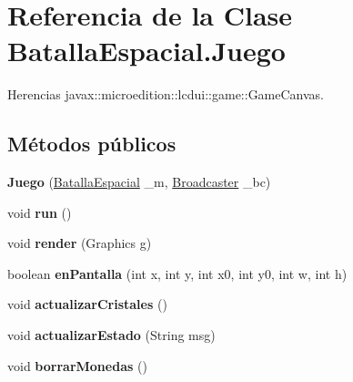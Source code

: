 \hypertarget{classBatallaEspacial_1_1Juego}{
\section{Referencia de la Clase BatallaEspacial.Juego}
\label{classBatallaEspacial_1_1Juego}
}


Herencias javax::microedition::lcdui::game::GameCanvas.

\subsection*{Métodos públicos}
\begin{DoxyCompactItemize}
\item 
\hypertarget{classBatallaEspacial_1_1Juego_aaa24d750cd2702b1a8a0fe942da7fa5e}{
{\bfseries Juego} (\hyperlink{classBatallaEspacial_1_1BatallaEspacial}{BatallaEspacial} \_\-m, \hyperlink{classBatallaEspacial_1_1Broadcaster}{Broadcaster} \_\-bc)}
\label{classBatallaEspacial_1_1Juego_aaa24d750cd2702b1a8a0fe942da7fa5e}

\item 
\hypertarget{classBatallaEspacial_1_1Juego_ada0d4b65fb772f1e284e9bc34d01e29a}{
void {\bfseries run} ()}
\label{classBatallaEspacial_1_1Juego_ada0d4b65fb772f1e284e9bc34d01e29a}

\item 
\hypertarget{classBatallaEspacial_1_1Juego_a1117da461713e965c2fab1b899900f33}{
void {\bfseries render} (Graphics g)}
\label{classBatallaEspacial_1_1Juego_a1117da461713e965c2fab1b899900f33}

\item 
\hypertarget{classBatallaEspacial_1_1Juego_a1763c2fe7a86394d2cf9be175be144cc}{
boolean {\bfseries enPantalla} (int x, int y, int x0, int y0, int w, int h)}
\label{classBatallaEspacial_1_1Juego_a1763c2fe7a86394d2cf9be175be144cc}

\item 
\hypertarget{classBatallaEspacial_1_1Juego_a4b603f4c903e3dedda9e82893dec9c4b}{
void {\bfseries actualizarCristales} ()}
\label{classBatallaEspacial_1_1Juego_a4b603f4c903e3dedda9e82893dec9c4b}

\item 
\hypertarget{classBatallaEspacial_1_1Juego_a8c738255f12bb1667d8e7ed3cb85f8f3}{
void {\bfseries actualizarEstado} (String msg)}
\label{classBatallaEspacial_1_1Juego_a8c738255f12bb1667d8e7ed3cb85f8f3}

\item 
\hypertarget{classBatallaEspacial_1_1Juego_a85e78f151a72d48e1b2c2ca55ffa9dd9}{
void {\bfseries borrarMonedas} ()}
\label{classBatallaEspacial_1_1Juego_a85e78f151a72d48e1b2c2ca55ffa9dd9}


\end{DoxyCompactItemize}

